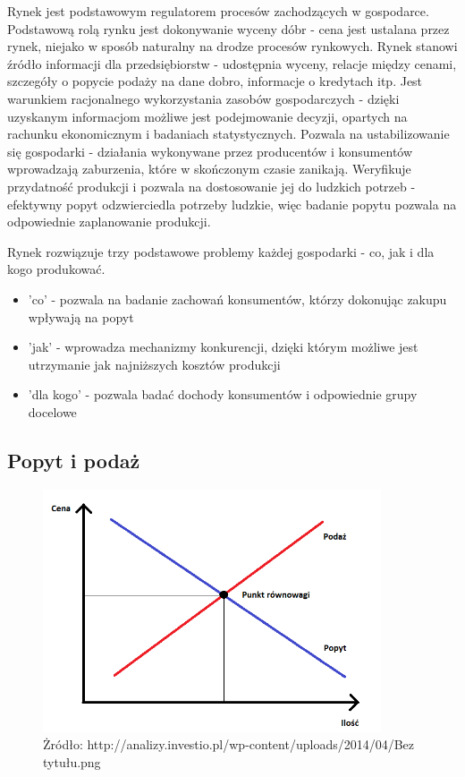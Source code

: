 \documentclass[12pt]{extarticle}
\begin{document}
Rynek jest podstawowym regulatorem procesów zachodzących w gospodarce. Podstawową rolą rynku jest dokonywanie wyceny dóbr - cena jest ustalana przez rynek, niejako w sposób naturalny na drodze procesów rynkowych. Rynek stanowi źródło informacji dla przedsiębiorstw - udostępnia wyceny, relacje między cenami, szczegóły o popycie podaży na dane dobro, informacje o kredytach itp. Jest warunkiem racjonalnego wykorzystania zasobów gospodarczych - dzięki uzyskanym informacjom możliwe jest podejmowanie decyzji, opartych na rachunku ekonomicznym i badaniach statystycznych. Pozwala na ustabilizowanie się gospodarki - działania wykonywane przez producentów i konsumentów wprowadzają zaburzenia, które w skończonym czasie zanikają. Weryfikuje przydatność produkcji i pozwala na dostosowanie jej do ludzkich potrzeb - efektywny popyt odzwierciedla potrzeby ludzkie, więc badanie popytu pozwala na odpowiednie zaplanowanie produkcji.

Rynek rozwiązuje trzy podstawowe problemy każdej gospodarki - co, jak i dla kogo produkować.

\begin{itemize}
	\item 'co' - pozwala na badanie zachowań konsumentów, którzy dokonując zakupu wpływają na popyt
	\item 'jak' - wprowadza mechanizmy konkurencji, dzięki którym możliwe jest utrzymanie jak najniższych kosztów produkcji
    \item 'dla kogo' - pozwala badać dochody konsumentów i odpowiednie grupy docelowe
\end{itemize}

\subsection{Popyt i podaż}


\begin{figure}[H]
\centering
\includegraphics[width=10cm]{popyt_podaz}
    \caption{Żródło: http://analizy.investio.pl/wp-content/uploads/2014/04/Bez tytułu.png}
\end{figure}
\end{document}
